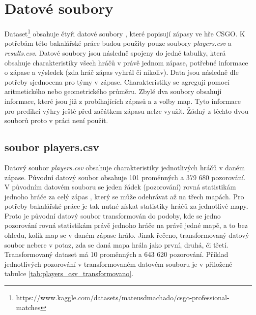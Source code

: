 \section{Datové soubory}
Dataset\footnote{https://www.kaggle.com/datasets/mateusdmachado/csgo-professional-matches} obsahuje čtyři 
{\color{red}
datové soubory
}
, které popisují zápasy ve hře
\ac{CSGO}. K potřebám této bakalářské práce budou použity pouze soubory \textit{players.csv} a \textit{results.csv}. Datové soubory jsou následně spojeny do jedné tabulky,
která obsahuje charakteristiky všech hráčů v právě jednom zápase, potřebné informace o zápase a výsledek (zda hráč zápas vyhrál či nikoliv). Data jsou následně dle potřeby
sjednocena pro týmy v zápase. Charakteristiky se agregují pomocí aritmetického nebo geometrického průměru. Zbylé dva soubory obsahují
informace, které jsou již z probíhajících zápasů a z volby map. Tyto informace pro predikci výhry ještě před začátkem zápasu nelze využít. Žádný z těchto
dvou souborů proto v práci není použit.

\subsection{soubor players.csv}
{\color{red}
Datový soubor
}
\textit{players.csv} obsahuje 
{\color{red}
charakteristiky
}
jednotlivých hráčů v daném zápase. Původní datový soubor obsahuje 101 proměnných a 379 680 pozorování.
V původním datovém souboru se jeden řádek (pozorování) rovná statistikám jednoho hráče za celý zápas
{\color{red}
, který se může odehrávat až na třech mapách.
}
Pro potřeby bakalářské práce je tak nutné získat statistiky hráčů
za jednotlivé mapy. Proto je původní datový soubor transformován do podoby, kde se jedno pozorování rovná statistikám
právě jednoho hráče na právě jedné mapě, a to bez ohledu, kolik map se v daném zápase hrálo. Jinak řečeno, transformovaný datový soubor nebere v potaz, zda
se daná mapa hrála jako první, druhá, či třetí.
Transformovaný dataset má 10 proměnných a 643 620 pozorování. Příklad jednotlivých pozorování v transformovaném
datovém souboru je v přiložené tabulce \ref{tab:players_csv_transformovano}.


